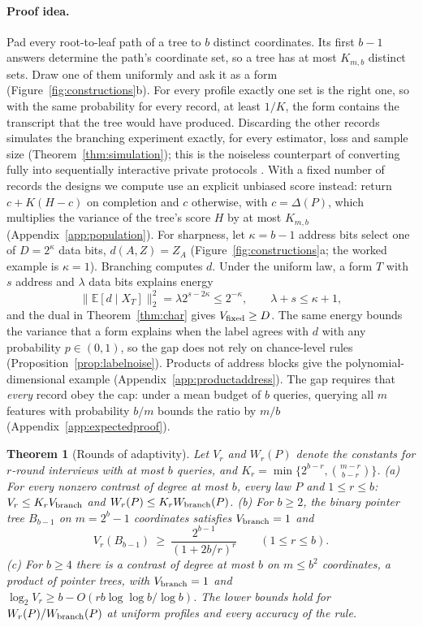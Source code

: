 \documentclass{article}
\newtheorem{theorem}{Theorem}
\newcommand{\E}{\mathbb{E}}
\begin{document}
\paragraph{Proof idea.}
Pad every root-to-leaf path of a tree to $b$ distinct coordinates. Its first $b-1$ answers determine the path's coordinate set, so a tree has at most $K_{m,b}$ distinct sets. Draw one of them uniformly and ask it as a form (Figure~\ref{fig:constructions}b). For every profile exactly one set is the right one, so with the same probability for every record, at least $1/K$, the form contains the transcript that the tree would have produced. Discarding the other records simulates the branching experiment exactly, for every estimator, loss and sample size (Theorem~\ref{thm:simulation}); this is the noiseless counterpart of converting fully into sequentially interactive private protocols \citep{joseph2019}. With a fixed number of records the designs we compute use an explicit unbiased score instead: return $c+K(H-c)$ on completion and $c$ otherwise, with $c=\Delta(P)$, which multiplies the variance of the tree's score $H$ by at most $K_{m,b}$ (Appendix~\ref{app:population}). For sharpness, let $\kappa=b-1$ address bits select one of $D=2^\kappa$ data bits, $d(A,Z)=Z_A$ (Figure~\ref{fig:constructions}a; the worked example is $\kappa=1$). Branching computes $d$. Under the uniform law, a form $T$ with $s$ address and $\lambda$ data bits explains energy
\begin{equation}
 \|\E[d\mid X_T]\|_2^2=\lambda2^{s-2\kappa}\le2^{-\kappa},\qquad \lambda+s\le\kappa+1,\label{eq:addressinformation}
\end{equation}
and the dual in Theorem~\ref{thm:char} gives $V_{\rm fixed}\ge D$. The same energy bounds the variance that a form explains when the label agrees with $d$ with any probability $p\in(0,1)$, so the gap does not rely on chance-level rules (Proposition~\ref{prop:labelnoise}). Products of address blocks give the polynomial-dimensional example (Appendix~\ref{app:productaddress}). The gap requires that \emph{every} record obey the cap: under a mean budget of $b$ queries, querying all $m$ features with probability $b/m$ bounds the ratio by $m/b$ (Appendix~\ref{app:expectedproof}).

\begin{theorem}[Rounds of adaptivity]\label{thm:rounds}
Let $V_r$ and $W_r(P)$ denote the constants for $r$-round interviews with at most $b$ queries, and $K_r=\min\{2^{b-r},\binom{m-r}{b-r}\}$.
\textup{(a)} For every nonzero contrast of degree at most $b$, every law $P$ and $1\le r\le b$: $V_r\le K_rV_{\rm branch}$ and $W_r(P)\le K_rW_{\rm branch}(P)$.
\textup{(b)} For $b\ge2$, the binary pointer tree $B_{b-1}$ on $m=2^b-1$ coordinates satisfies $V_{\rm branch}=1$ and
\[
 V_r(B_{b-1})\ \ge\ \frac{2^{b-1}}{(1+2b/r)^{r}}\qquad(1\le r\le b).
\]
\textup{(c)} For $b\ge4$ there is a contrast of degree at most $b$ on $m\le b^2$ coordinates, a product of pointer trees, with $V_{\rm branch}=1$ and $\log_2V_r\ge b-O(rb\log\log b/\log b)$.
The lower bounds hold for $W_r(P)/W_{\rm branch}(P)$ at uniform profiles and every accuracy of the rule.
\end{theorem}
\end{document}
